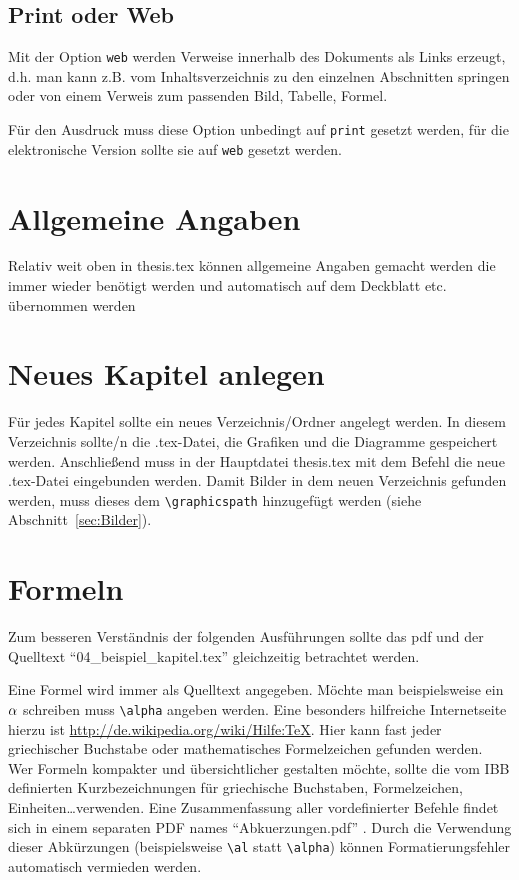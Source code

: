 \subsection{Print oder Web}
Mit der Option \verb+web+ werden Verweise innerhalb des Dokuments als Links
erzeugt, d.h. man kann z.B. vom Inhaltsverzeichnis zu den einzelnen Abschnitten
springen oder von einem Verweis zum passenden Bild, Tabelle, Formel.

Für den Ausdruck muss diese Option unbedingt auf \verb+print+ gesetzt werden,
für die elektronische Version sollte sie auf \verb+web+ gesetzt werden.



\section{Allgemeine Angaben}

Relativ weit oben in thesis.tex können allgemeine Angaben gemacht werden die
immer wieder benötigt werden und automatisch auf dem Deckblatt etc. übernommen
werden


\section{Neues Kapitel anlegen}

Für jedes Kapitel sollte ein neues Verzeichnis/Ordner angelegt werden. In diesem
Verzeichnis sollte/n die .tex-Datei, die Grafiken und die Diagramme gespeichert
werden.
Anschließend muss in der Hauptdatei thesis.tex mit dem Befehl
\verb++ die neue .tex-Datei eingebunden werden.
Damit Bilder in dem neuen Verzeichnis gefunden werden, muss dieses dem
\verb+\graphicspath+ hinzugefügt werden (siehe Abschnitt~\ref{sec:Bilder}).


\section{Formeln}
Zum besseren Verständnis der folgenden Ausführungen sollte das pdf und der
Quelltext "`04\_beispiel\_kapitel.tex"' gleichzeitig betrachtet werden.

Eine Formel wird immer als Quelltext angegeben. Möchte man beispielsweise ein
${\alpha}$ schreiben muss \verb+\alpha+ angeben werden. Eine besonders
hilfreiche Internetseite hierzu ist
\url{http://de.wikipedia.org/wiki/Hilfe:TeX}.
Hier kann fast jeder griechischer Buchstabe oder mathematisches Formelzeichen
gefunden werden. Wer Formeln kompakter und übersichtlicher gestalten möchte,
sollte die vom IBB definierten Kurzbezeichnungen für griechische Buchstaben,
Formelzeichen, Einheiten\ldots verwenden. Eine Zusammenfassung aller vordefinierter Befehle findet sich in
einem separaten PDF names "`Abkuerzungen.pdf"' .
Durch die Verwendung dieser Abkürzungen (beispielsweise \verb+\al+ statt
\verb+\alpha+) können Formatierungsfehler automatisch vermieden werden.

